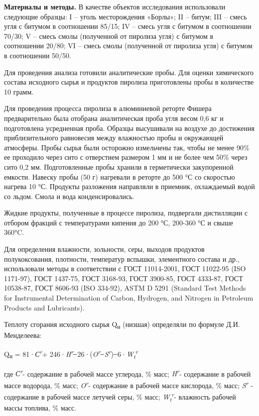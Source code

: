 \textbf{Материалы и методы.} В качестве объектов исследования
использовали следующие образцы: I -- уголь месторождения «Борлы»; II --
битум; III -- смесь угля с битумом в соотношении 85/15; IV -- смесь угля
с битумом в соотношении 70/30; V -- смесь смолы (полученной от пиролиза
угля) с битумом в соотношении 20/80; VI -- смесь смолы (полученной от
пиролиза угля) с битумом в соотношении 50/50.

Для проведения анализа готовили аналитические пробы. Для оценки
химического состава исходного сырья и продуктов пиролиза приготовлены
пробы в количестве 10 грамм.

Для проведения процесса пиролиза в алюминиевой реторте Фишера
предварительно была отобрана аналитическая проба угля весом 0,6 кг и
подготовлена усредненная проба. Образцы высушивали на воздухе до
достижения приблизительного равновесия между влажностью пробы и
окружающей атмосферы. Пробы сырья были осторожно измельчены так, чтобы
не менее 90\% ее проходило через сито с отверстием размером 1 мм и не
более чем 50\% через сито 0,2 мм. Подготовленные пробы хранили в
герметически закупоренной емкости. Навеску пробы (50 г) нагревали в
реторте до 500 °С со скоростью нагрева 10 °С. Продукты разложения
направляли в приемник, охлаждаемый водой со льдом. Смола и вода
конденсировались.

Жидкие продукты, полученные в процессе пиролиза, подвергали дистилляции
с отбором фракций с температурами кипения до 200 °С, 200-360 °С и свыше
360°C.

Для определения влажности, зольности, серы, выходов продуктов
полукоксования, плотности, температур вспышки, элементного состава и
др., использовали методы в соответствии с ГОСТ 11014-2001, ГОСТ 11022-95
(ISO 1171-97), ГОСТ 1437-75, ГОСТ 3168-93, ГОСТ 3900-85, ГОСТ 4333-87,
ГОСТ 10538-87, ГОСТ 8606-93 (ISO 334-92), ASTM D 5291 (Standard Test
Methods for Instrumental Determination of Carbon, Hydrogen, and Nitrogen
in Petroleum Products and Lubricants).

Теплоту сгорания исходного сырья Q\textsubscript{н} (низшая) определяли
по формуле Д.И. Менделеева:

Q\textsubscript{н} = 81·\emph{С\textsuperscript{r}}+
246·\emph{H\textsuperscript{r}} ̶ 26·(\emph{O\textsuperscript{r}} ̶
\emph{S\textsuperscript{r}}) ̶
6·\emph{W\textsubscript{t}\textsuperscript{r}}

где \emph{С\textsuperscript{r}}- содержание в рабочей массе углерода, \%
масс; \emph{H\textsuperscript{r}}- содержание в рабочей массе водорода,
\% масс; \emph{O\textsuperscript{r}}- содержание в рабочей массе
кислорода, \% масс; \emph{S\textsuperscript{r}} - содержание в рабочей
массе летучей серы, \% масс;
\emph{W\textsubscript{t}\textsuperscript{r}}- влажность рабочей массы
топлива, \% масс.

